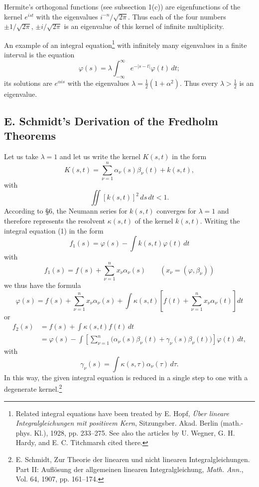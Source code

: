 Hermite's orthogonal functions (see subsection 1(c)) are eigenfunctions of the kernel $e^{ist}$ with the eigenvalues $i^{-n}/\sqrt{2\pi}$. Thus each of the four numbers $\pm1/\sqrt{2\pi}$, $\pm i/\sqrt{2\pi}$ is an eigenvalue of this kernel of infinite multiplicity.

An example of an integral equation\footnote{Related integral equations have been treated by E. Hopf, \emph{\"Uber lineare Integralgleichungen mit positivem Kern}, Sitzungsber. Akad. Berlin (math.-phys. Kl.), 1928, pp. 233--275. See also the articles by U. Wegner, G. H. Hardy, and E. C. Titchmarsh cited there.} with infinitely many eigenvalues in a finite interval is the equation
\[
\varphi(s)=\lambda\int_{-\infty}^{\infty}e^{-|s-t|}\varphi(t)\,dt;
\]
its solutions are $e^{\alpha is}$ with the eigenvalues $\lambda=\tfrac12(1+\alpha^2)$. Thus every $\lambda>\tfrac12$ is an eigenvalue.

\subsection{E. Schmidt's Derivation of the Fredholm Theorems}
Let us take $\lambda=1$ and let us write the kernel $K(s,t)$ in the form
\[
K(s,t)=\sum_{\nu=1}^{n}\alpha_\nu(s)\beta_\nu(t)+k(s,t),
\]
with
\[
\iint [k(s,t)]^2\,ds\,dt<1.
\]
According to \S6, the Neumann series for $k(s,t)$ converges for $\lambda=1$ and therefore represents the resolvent $\kappa(s,t)$ of the kernel $k(s,t)$. Writing the integral equation (1) in the form
\[
f_1(s)=\varphi(s)-\int k(s,t)\varphi(t)\,dt
\]
with
\[
f_1(s)=f(s)+\sum_{\nu=1}^{n}x_\nu\alpha_\nu(s)
\qquad (x_\nu=(\varphi,\beta_\nu))
\]
we thus have the formula
\[
\varphi(s)=f(s)+\sum_{\nu=1}^{n}x_\nu\alpha_\nu(s)
+\int\kappa(s,t)\left[f(t)+\sum_{\nu=1}^{n}x_\nu\alpha_\nu(t)\right]dt
\]
or
\[
\begin{aligned}
f_2(s)
&=f(s)+\int\kappa(s,t)f(t)\,dt\\
&=\varphi(s)-\int\left[\sum_{\nu=1}^{n}\bigl(\alpha_\nu(s)\beta_\nu(t)+\gamma_\nu(s)\beta_\nu(t)\bigr)\right]\varphi(t)\,dt,
\end{aligned}
\]
with
\[
\gamma_\nu(s)=\int\kappa(s,\tau)\alpha_\nu(\tau)\,d\tau.
\]
In this way, the given integral equation is reduced in a single step to one with a degenerate kernel.\footnote{E. Schmidt, Zur Theorie der linearen und nicht linearen Integralgleichungen. Part II: Aufl\"osung der allgemeinen linearen Integralgleichung, \emph{Math. Ann.}, Vol. 64, 1907, pp. 161--174.}


